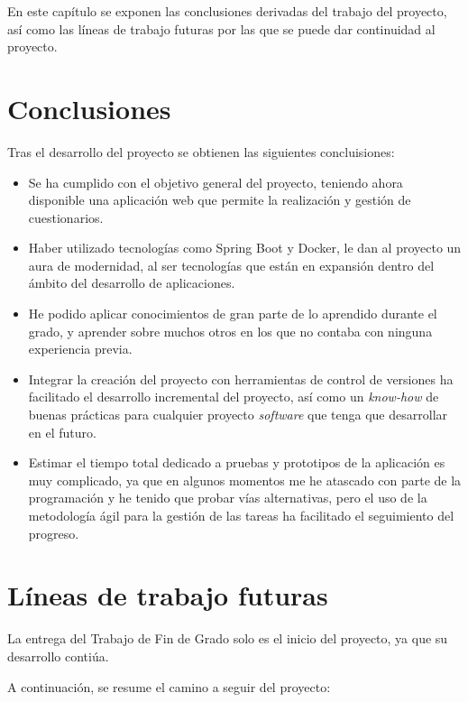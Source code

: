 
En este capítulo se exponen las conclusiones derivadas del trabajo del proyecto, así como las líneas de trabajo futuras por las que se puede dar continuidad al proyecto.

\section{Conclusiones}

Tras el desarrollo del proyecto se obtienen las siguientes concluisiones:

\begin{itemize}
	\item Se ha cumplido con el objetivo general del proyecto, teniendo ahora disponible una aplicación web que permite la realización y gestión de cuestionarios.
	\item Haber utilizado tecnologías como Spring Boot y Docker, le dan al proyecto un aura de modernidad, al ser tecnologías que están en expansión dentro del ámbito del desarrollo de aplicaciones.
	\item He podido aplicar conocimientos de gran parte de lo aprendido durante el grado, y aprender sobre muchos otros en los que no contaba con ninguna experiencia previa.
	\item Integrar la creación del proyecto con herramientas de control de versiones ha facilitado el desarrollo incremental del proyecto, así como un \textit{know-how} de buenas prácticas para cualquier proyecto \textit{software} que tenga que desarrollar en el futuro.
	\item Estimar el tiempo total dedicado a pruebas y prototipos de la aplicación es muy complicado, ya que en algunos momentos me he atascado con parte de la programación y he tenido que probar vías alternativas, pero el uso de la metodología ágil para la gestión de las tareas ha facilitado el seguimiento del progreso.
\end{itemize}

\section{Líneas de trabajo futuras}

La entrega del Trabajo de Fin de Grado solo es el inicio del proyecto, ya que su desarrollo contiúa.

A continuación, se resume el camino a seguir del proyecto:

